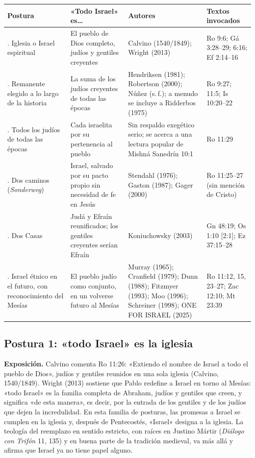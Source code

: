 \begin{center}\footnotesize
\renewcommand{\arraystretch}{1.3}
\begin{tabular}{>{\RaggedRight\arraybackslash}p{2.6cm}>{\RaggedRight\arraybackslash}p{4.3cm}>{\RaggedRight\arraybackslash}p{3.4cm}>{\RaggedRight\arraybackslash}p{3.7cm}}
\toprule
\textbf{Postura} & \textbf{«Todo Israel» es\ldots} & \textbf{Autores} & \textbf{Textos invocados}\\
\midrule
1. Iglesia o Israel espiritual & El pueblo de Dios completo, judíos y gentiles creyentes & Calvino (1540/1849); Wright (2013) & Ro 9:6; Gá 3:28--29; 6:16; Ef 2:14--16\\
2. Remanente elegido a lo largo de la historia & La suma de los judíos creyentes de todas las épocas & Hendriksen (1981); Robertson (2000); Núñez (s.\,f.); a menudo se incluye a Ridderbos (1975) & Ro 9:27; 11:5; Is 10:20--22\\
3. Todos los judíos de todas las épocas & Cada israelita por su pertenencia al pueblo & Sin respaldo exegético serio; se acerca a una lectura popular de Mishná Sanedrín 10:1 & Ro 11:29\\
4. Dos caminos (\emph{Sonderweg}) & Israel, salvado por su pacto propio sin necesidad de fe en Jesús & Stendahl (1976); Gaston (1987); Gager (2000) & Ro 11:25--27 (sin mención de Cristo)\\
5. Dos Casas & Judá y Efraín reunificados; los gentiles creyentes serían Efraín & Koniuchowsky (2003) & Gn 48:19; Os 1:10 [2:1]; Ez 37:15--28\\
6. Israel étnico en el futuro, con reconocimiento del Mesías & El pueblo judío como conjunto, en un volverse futuro al Mesías & Murray (1965); Cranfield (1979); Dunn (1988); Fitzmyer (1993); Moo (1996); Schreiner (1998); ONE FOR ISRAEL (2025) & Ro 11:12, 15, 23--27; Zac 12:10; Mt 23:39\\
\bottomrule
\end{tabular}\end{center}

\subsection{Postura 1: «todo Israel» es la iglesia}
\textbf{Exposición.} Calvino comenta Ro 11:26: «Extiendo el nombre de Israel a todo el pueblo de Dios», judíos y gentiles reunidos en una sola iglesia (Calvino, 1540/1849). Wright (2013) sostiene que Pablo redefine a Israel en torno al Mesías: «todo Israel» es la familia completa de Abraham, judíos y gentiles que creen, y  significa «de esta manera», es decir, por la entrada de los gentiles y de los judíos que dejen la incredulidad. En esta familia de posturas, las promesas a Israel se cumplen en la iglesia y, después de Pentecostés, «Israel» designa a la iglesia. La teología del reemplazo en sentido estricto, con raíces en Justino Mártir (\emph{Diálogo con Trifón} 11, 135) y en buena parte de la tradición medieval, va más allá y afirma que Israel ya no tiene papel alguno.

